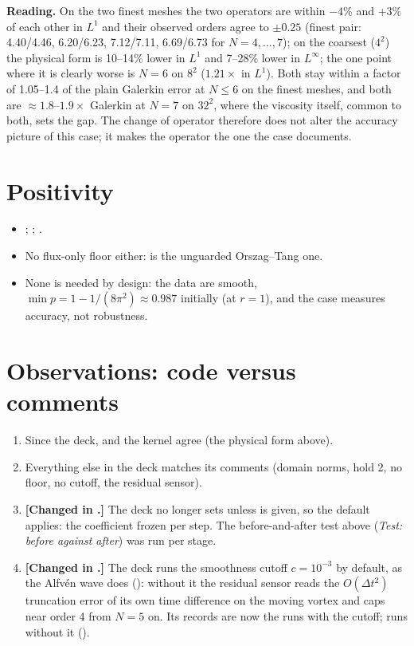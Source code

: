 \documentclass[10pt]{article}
\begin{document}
\noindent\textbf{Reading.} On the two finest meshes the two operators are within $-4\%$ and $+3\%$ of each other in $L^1$
and their observed orders agree to $\pm0.25$ (finest pair: 4.40/4.46, 6.20/6.23, 7.12/7.11, 6.69/6.73 for $N=4,\dots,7$);
on the coarsest ($4^2$) the physical form is 10--14\% lower in $L^1$ and 7--28\% lower in $L^\infty$; the one point
where it is clearly worse is $N=6$ on $8^2$ ($1.21\times$ in $L^1$). Both stay within a factor of 1.05--1.4 of the
plain Galerkin error at $N\le6$ on the finest meshes, and both are $\approx1.8$--$1.9\times$ Galerkin at $N=7$ on $32^2$,
where the viscosity itself, common to both, sets the gap. The change of operator therefore does not alter the
accuracy picture of this case; it makes the operator the one the case documents.

\section{Positivity}
\begin{itemize}[leftmargin=*]
\item {}; ; .
\item No flux-only floor either:  is the unguarded Orszag--Tang one.
\item None is needed by design: the data are smooth, $\min p = 1-1/(8\pi^2)\approx0.987$ initially (at $r=1$), and
the case measures accuracy, not robustness.
\end{itemize}

\section{Observations: code versus comments}
\begin{enumerate}[leftmargin=*]
\item Since  the deck,  and the kernel agree (the physical form above).
\item Everything else in the deck matches its comments (domain norms, hold 2, no floor, no cutoff,
the residual sensor).
\item \textbf{[Changed in .]} The deck no longer sets  unless
 is given, so the  default applies: the coefficient frozen per step. The
before-and-after test above (\emph{Test: before against after}) was run per stage.
\item \textbf{[Changed in .]} The deck runs the smoothness cutoff $c=10^{-3}$ by default, as the Alfv\'en wave
does (): without it the residual sensor reads the $O(\Delta t^2)$ truncation error of its own time
difference on the moving vortex and caps \dsgs{} near order 4 from $N=5$ on. Its records  are now the runs with
the cutoff;  runs without it ().
\end{enumerate}


\end{document}

